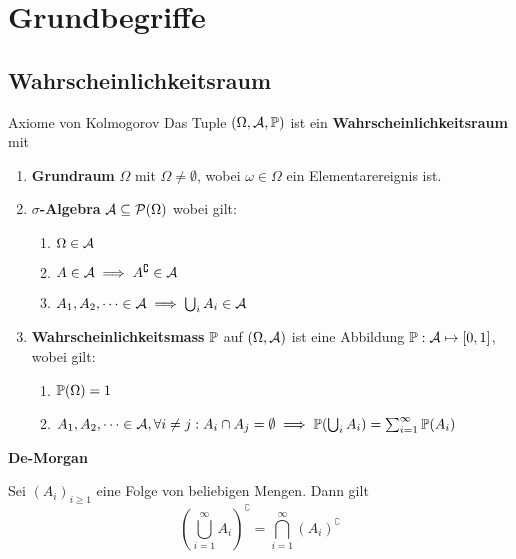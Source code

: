 \section{Grundbegriffe}
\subsection{Wahrscheinlichkeitsraum}
\begin{mainbox}{Axiome von Kolmogorov}
    Das Tuple $(\Omega, \A, \P)$ ist ein \textbf{Wahrscheinlichkeitsraum} mit 
    \begin{enumerate}[label=\Roman*.]
        \item \textbf{Grundraum} $\Omega$ mit $\Omega \neq \emptyset$, wobei $\omega \in \Omega$ ein Elementarereignis ist.
        \item \textbf{$\sigma$-Algebra} $\A \subseteq \Pset(\Omega)$ wobei gilt:
        \begin{enumerate}[label=\arabic*.]
            \item $\Omega \in \A$
            \item $A \in \A \implies A^\complement \in \A$
            \item $A_1,A_2,\dots \in \A \implies \bigcup_i A_i \in \A$
        \end{enumerate}
        \item \textbf{Wahrscheinlichkeitsmass} $\P$ auf $(\Omega, \A)$ ist eine Abbildung $\P: \A \mapsto [0,1]$, wobei gilt:
        \begin{enumerate}[label=\arabic*.]
            \item $\P(\Omega) = 1$
            \item $A_1, A_2, \dots \in \A, \forall i \neq j: A_i \cap A_j = \emptyset \\ \implies \P(\bigcup_i A_i) = \sum_{i= 1}^\infty \P(A_i)$
        \end{enumerate}
    \end{enumerate}
\end{mainbox}

\textbf{De-Morgan}
    
Sei $(A_i)_{i \geq 1}$ eine Folge von beliebigen Mengen. Dann gilt
    $$\left(\bigcup_{i = 1}^{\infty}A_i\right)^\complement = \bigcap_{i = 1}^{\infty} (A_i)^\complement$$


